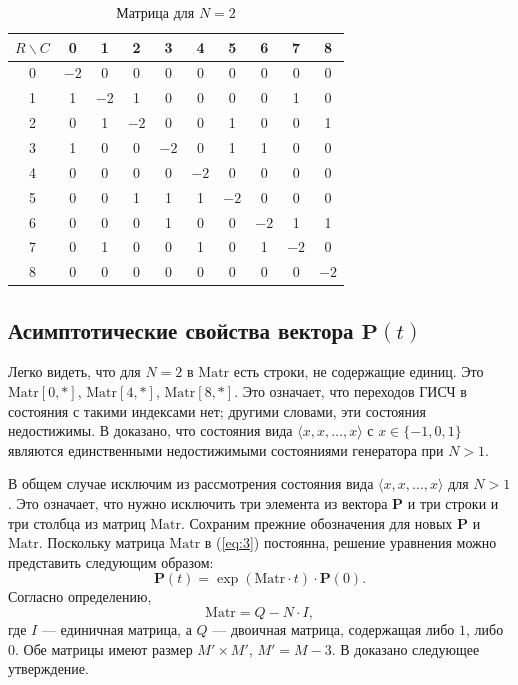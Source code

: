 \documentclass[a4paper,12pt]{article}
\begin{document}
\begin{table}[h]
\centering
\caption{Матрица для $N=2$}
\label{tab:3}
\begin{tabular}{c|ccccccccc}
$R\backslash C$ & 0 & 1 & 2 & 3 & 4 & 5 & 6 & 7 & 8 \\ \hline
0 & $-2$ & 0 & 0 & 0 & 0 & 0 & 0 & 0 & 0 \\
1 & 1 & $-2$ & 1 & 0 & 0 & 0 & 0 & 1 & 0 \\
2 & 0 & 1 & $-2$ & 0 & 0 & 1 & 0 & 0 & 1 \\
3 & 1 & 0 & 0 & $-2$ & 0 & 1 & 1 & 0 & 0 \\
4 & 0 & 0 & 0 & 0 & $-2$ & 0 & 0 & 0 & 0 \\
5 & 0 & 0 & 1 & 1 & 1 & $-2$ & 0 & 0 & 0 \\
6 & 0 & 0 & 0 & 1 & 0 & 0 & $-2$ & 1 & 1 \\
7 & 0 & 1 & 0 & 0 & 1 & 0 & 1 & $-2$ & 0 \\
8 & 0 & 0 & 0 & 0 & 0 & 0 & 0 & 0 & $-2$
\end{tabular}
\end{table}

\subsection{Асимптотические свойства вектора $\mathbf{P}(t)$}

Легко видеть, что для $N=2$ в $\mathrm{Matr}$ есть строки, не содержащие единиц. Это $\mathrm{Matr}[0,*]$, $\mathrm{Matr}[4,*]$, $\mathrm{Matr}[8,*]$. Это означает, что переходов ГИСЧ в состояния с такими индексами нет; другими словами, эти состояния недостижимы. В \cite{latypov2017} доказано, что состояния вида $\langle x, x, \ldots, x\rangle$ с $x\in\{-1,0,1\}$ являются единственными недостижимыми состояниями генератора при $N>1$.

В общем случае исключим из рассмотрения состояния вида $\langle x, x, \ldots, x\rangle$ для $N>1$. Это означает, что нужно исключить три элемента из вектора $\mathbf{P}$ и три строки и три столбца из матриц $\mathrm{Matr}$. Сохраним прежние обозначения для новых $\mathbf{P}$ и $\mathrm{Matr}$. Поскольку матрица $\mathrm{Matr}$ в (\ref{eq:3}) постоянна, решение уравнения можно представить следующим образом:
\begin{equation}
\mathbf{P}(t) = \exp(\mathrm{Matr}\cdot t)\cdot \mathbf{P}(0).
\label{eq:5}
\end{equation}
Согласно определению,
\begin{equation}
\mathrm{Matr} = Q - N\cdot I,
\label{eq:6}
\end{equation}
где $I$ --- единичная матрица, а $Q$ --- двоичная матрица, содержащая либо $1$, либо $0$. Обе матрицы имеют размер $M'\times M'$, $M' = M - 3$. В \cite{latypov2017} доказано следующее утверждение.
\end{document}
